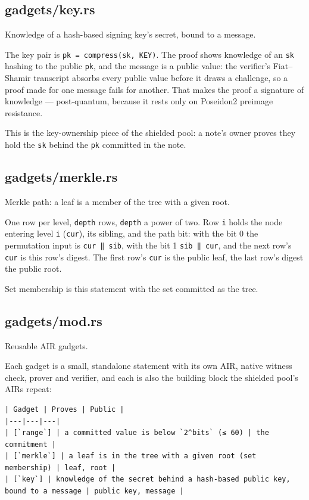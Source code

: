\documentclass[11pt,a4paper]{article}
\begin{document}
\subsection{gadgets/key.rs}
Knowledge of a hash-based signing key's secret, bound to a message.

The key pair is \texttt{pk = compress(sk, KEY)}. The proof shows knowledge of an
\texttt{sk} hashing to the public \texttt{pk}, and the message is a public value: the
verifier's Fiat–Shamir transcript absorbs every public value before it
draws a challenge, so a proof made for one message fails for another. That
makes the proof a signature of knowledge — post-quantum, because it rests
only on Poseidon2 preimage resistance.

This is the key-ownership piece of the shielded pool: a note's owner
proves they hold the \texttt{sk} behind the \texttt{pk} committed in the note.

\subsection{gadgets/merkle.rs}
Merkle path: a leaf is a member of the tree with a given root.

One row per level, \texttt{depth} rows, \texttt{depth} a power of two. Row \texttt{i} holds the
node entering level \texttt{i} (\texttt{cur}), its sibling, and the path bit: with the
bit 0 the permutation input is \texttt{cur ‖ sib}, with the bit 1 \texttt{sib ‖ cur}, and
the next row's \texttt{cur} is this row's digest. The first row's \texttt{cur} is the
public leaf, the last row's digest the public root.

Set membership is this statement with the set committed as the tree.

\subsection{gadgets/mod.rs}
Reusable AIR gadgets.

Each gadget is a small, standalone statement with its own AIR, native
witness check, prover and verifier, and each is also the building block
the shielded pool's AIRs repeat:

\begin{verbatim}
| Gadget | Proves | Public |
|---|---|---|
| [`range`] | a committed value is below `2^bits` (≤ 60) | the commitment |
| [`merkle`] | a leaf is in the tree with a given root (set membership) | leaf, root |
| [`key`] | knowledge of the secret behind a hash-based public key, bound to a message | public key, message |
\end{verbatim}
\end{document}
